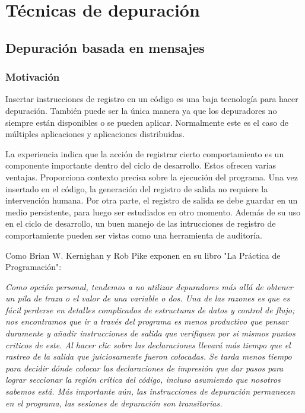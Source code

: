 \documentclass[12pt,a4paper]{report}
\begin{document}
	\section{Técnicas de depuración}
		\subsection{Depuración basada en mensajes}
			\subsubsection{Motivación}

Insertar instrucciones de registro en un código es una baja tecnología para hacer depuración.  También puede ser la única manera ya que los depuradores no siempre están disponibles o se pueden aplicar. Normalmente este es el caso de múltiples aplicaciones y aplicaciones distribuidas.

La experiencia indica que la acción de registrar cierto comportamiento es un componente importante dentro del ciclo de desarrollo. Estos ofrecen varias ventajas. Proporciona contexto precisa sobre la ejecución del programa. Una vez insertado en el código, la generación del registro de salida no requiere la intervención humana. Por otra parte, el registro de salida se debe guardar en un medio persistente, para luego ser estudiados en otro momento. Además de su uso en el ciclo de desarrollo, un buen manejo de las intrucciones de registro de comportamiente pueden ser vistas como una herramienta de auditoría.

Como Brian W. Kernighan y Rob Pike exponen en su libro "La Práctica de Programación":

\textit{Como opción personal, tendemos a no utilizar depuradores más allá de obtener un pila de traza o el valor de una variable o dos. Una de las razones es que es fácil perderse en detalles complicados de estructuras de datos y control de flujo; nos encontramos que ir a través del programa es menos productivo que pensar duramente y añadir instrucciones de salida que verifiquen por si mismos puntos criticos de este. Al hacer clic sobre las declaraciones llevará más tiempo que el rastreo de la salida que juiciosamente fueron colocadas. Se tarda menos tiempo para decidir dónde colocar las declaraciones de impresión que dar pasos para lograr seccionar la región crítica del código, incluso asumiendo que nosotros sabemos está. Más importante aún, las instrucciones de depuración permanecen en el programa, las sesiones de depuración son transitorias.}
\end{document}
